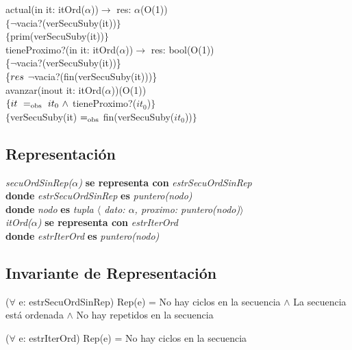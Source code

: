 actual(in it: itOrd($\alpha$))$\longrightarrow$ res: $\alpha$\hfill (O(1))\\
$\{\neg$vacia?(verSecuSuby(it))$\}$\\
$\{$prim(verSecuSuby(it))$\}$\\

tieneProximo?(in it: itOrd($\alpha$))$\longrightarrow$ res: bool\hfill (O(1))\\
\{$\neg$vacia?(verSecuSuby(it))\}\\
\{${res}$ \igobs $\neg$vacia?(fin(verSecuSuby(it)))\}\\

avanzar(inout it: itOrd($\alpha$))\hfill (O(1))\\
$\{\sombreritoWide{it}\ \igobs\ it_0\ \wedge$ tieneProximo?($it_0$)$\}$\\
$\{$verSecuSuby(it) $=_{\mathrm{obs}}$ fin(verSecuSuby($it_0$))$\}$\\


\subsection*{Representaci\'on}
\textit{secuOrdSinRep($\alpha$)} \textbf{se representa con} \textit{estrSecuOrdSinRep}\\
\textbf{donde} \textit{estrSecuOrdSinRep} \textbf{es} \textit{puntero(nodo)}\\
\textbf{donde} \textit{nodo} \textbf{es} \textit{tupla $\langle$ dato: $\alpha$, proximo: puntero(nodo)$\rangle$}\\

\textit{itOrd($\alpha$)} \textbf{se representa con} \textit{estrIterOrd}\\
\textbf{donde} \textit{estrIterOrd} \textbf{es} \textit{puntero(nodo)}\\

\subsection*{Invariante de Representaci\'on}
\vspace{11pt}
($\forall$ e: estrSecuOrdSinRep) Rep(e) = No hay ciclos en la secuencia $\wedge$ La secuencia est\'a ordenada $\wedge$ No hay repetidos en la secuencia

\vspace{22pt}

\vspace{11pt}
($\forall$ e: estrIterOrd) Rep(e) = No hay ciclos en la secuencia

